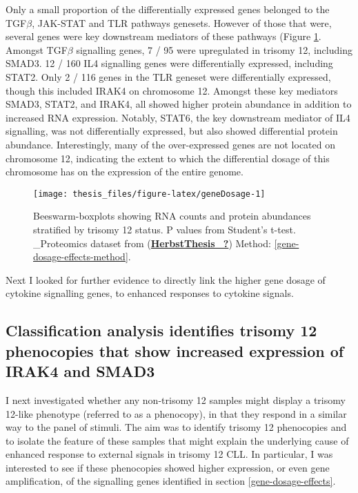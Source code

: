 \documentclass[11pt, a4paper, twosided]{book}
\begin{document}
Only a small proportion of the differentially expressed genes belonged to the TGF\(\beta\), JAK-STAT and TLR pathways genesets. However of those that were, several genes were key downstream mediators of these pathways (Figure \ref{fig:geneDosage}. Amongst TGF\(\beta\) signalling genes, 7 / 95 were upregulated in trisomy 12, including SMAD3. 12 / 160 IL4 signalling genes were differentially expressed, including STAT2. Only 2 / 116 genes in the TLR geneset were differentially expressed, though this included IRAK4 on chromosome 12. Amongst these key mediators SMAD3, STAT2, and IRAK4, all showed higher protein abundance in addition to increased RNA expression. Notably, STAT6, the key downstream mediator of IL4 signalling, was not differentially expressed, but also showed differential protein abundance. Interestingly, many of the over-expressed genes are not located on chromosome 12, indicating the extent to which the differential dosage of this chromosome has on the expression of the entire genome.


\begin{figure}

{\centering \texttt{[image: thesis\_files/figure-latex/geneDosage-1]} 

}

\caption{Beeswarm-boxplots showing RNA counts and protein abundances stratified by trisomy 12 status. P values from Student's t-test. \_Proteomics dataset from (\protect\hyperlink{ref-HerbstThesis_}{\textbf{HerbstThesis\_?}}) Method: \ref{gene-dosage-effects-method}.}\label{fig:geneDosage}
\end{figure}
Next I looked for further evidence to directly link the higher gene dosage of cytokine signalling genes, to enhanced responses to cytokine signals.

\hypertarget{trisomy12-classifier}{%
\subsection{Classification analysis identifies trisomy 12 phenocopies that show increased expression of IRAK4 and SMAD3}\label{trisomy12-classifier}}

I next investigated whether any non-trisomy 12 samples might display a trisomy 12-like phenotype (referred to as a phenocopy), in that they respond in a similar way to the panel of stimuli. The aim was to identify trisomy 12 phenocopies and to isolate the feature of these samples that might explain the underlying cause of enhanced response to external signals in trisomy 12 CLL. In particular, I was interested to see if these phenocopies showed higher expression, or even gene amplification, of the signalling genes identified in section \ref{gene-dosage-effects}.
\end{document}
